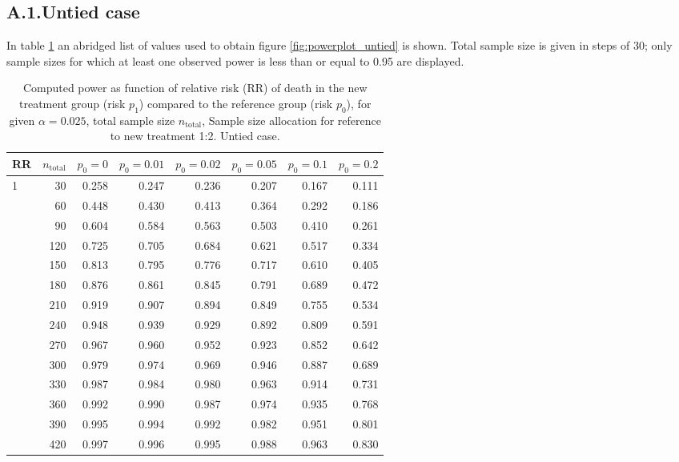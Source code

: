 \documentclass[bimj,fleqn]{w-art}\usepackage[]{graphicx}\usepackage[]{color}
\theoremstyle{plain}
\theoremstyle{definition}
\begin{document}
\subsection*{A.1.\enspace Untied case}
In table \ref{tab:AppendixUntied} an abridged list of values used to obtain
figure \ref{fig:powerplot_untied} is shown. Total sample size is given in steps
of 30; only sample sizes for which at least one observed power is less than or
equal to 0.95 are displayed.
\begin{table}[ht]
\centering
\caption{Computed power as function of relative risk
             (RR) of death in the new treatment group (risk $p_1$) compared to
             the reference group (risk $p_0$), for given $\alpha =0.025$,
             total sample size $n_{\text{total}}$, Sample size allocation for
             reference to new treatment 1:2. Untied case.} 
\label{tab:AppendixUntied}
\begin{tabular}{lrrrrrrr}
  \hline
RR & $n_{\text{total}}$ & $p_0 = 0$ & $p_0 = 0.01$ & $p_0 = 0.02$ & $p_0 = 0.05$ & $p_0 = 0.1$ & $p_0 = 0.2$ \\ 
  \hline
1 & 30 & 0.258 & 0.247 & 0.236 & 0.207 & 0.167 & 0.111 \\ 
   & 60 & 0.448 & 0.430 & 0.413 & 0.364 & 0.292 & 0.186 \\ 
   & 90 & 0.604 & 0.584 & 0.563 & 0.503 & 0.410 & 0.261 \\ 
   & 120 & 0.725 & 0.705 & 0.684 & 0.621 & 0.517 & 0.334 \\ 
   & 150 & 0.813 & 0.795 & 0.776 & 0.717 & 0.610 & 0.405 \\ 
   & 180 & 0.876 & 0.861 & 0.845 & 0.791 & 0.689 & 0.472 \\ 
   & 210 & 0.919 & 0.907 & 0.894 & 0.849 & 0.755 & 0.534 \\ 
   & 240 & 0.948 & 0.939 & 0.929 & 0.892 & 0.809 & 0.591 \\ 
   & 270 & 0.967 & 0.960 & 0.952 & 0.923 & 0.852 & 0.642 \\ 
   & 300 & 0.979 & 0.974 & 0.969 & 0.946 & 0.887 & 0.689 \\ 
   & 330 & 0.987 & 0.984 & 0.980 & 0.963 & 0.914 & 0.731 \\ 
   & 360 & 0.992 & 0.990 & 0.987 & 0.974 & 0.935 & 0.768 \\ 
   & 390 & 0.995 & 0.994 & 0.992 & 0.982 & 0.951 & 0.801 \\ 
   & 420 & 0.997 & 0.996 & 0.995 & 0.988 & 0.963 & 0.830 \\ 

\end{tabular}
\end{table}
\end{document}
